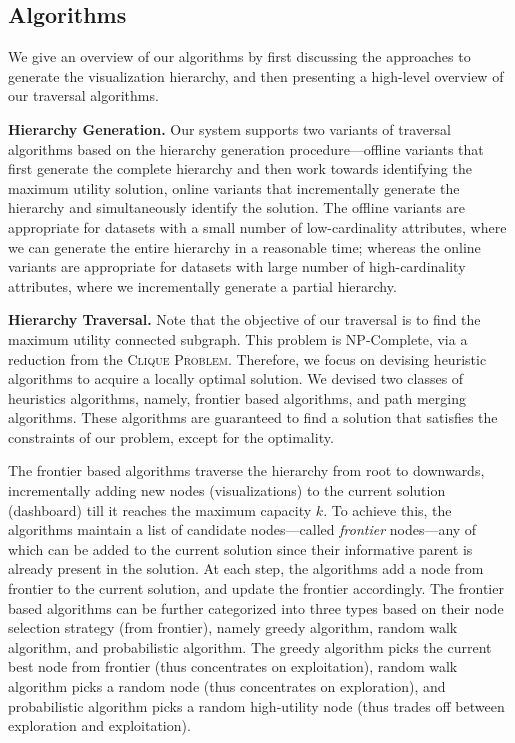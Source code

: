 \subsection{Algorithms}
We give an overview of our algorithms by first discussing the approaches to generate the visualization hierarchy, and then presenting a high-level overview of our traversal algorithms.

\textbf{Hierarchy Generation.} Our system supports two variants of traversal algorithms based on the hierarchy generation procedure---offline variants that first generate the complete hierarchy and then work towards identifying the maximum utility solution, online variants that incrementally generate the hierarchy and simultaneously identify the solution. The offline variants are appropriate for datasets with a small number of low-cardinality attributes, where we can generate the entire hierarchy in a reasonable time; whereas the online variants are appropriate for datasets with large number of high-cardinality attributes, where we incrementally generate a partial hierarchy. 


\textbf{Hierarchy Traversal.} Note that the objective of our traversal is to find the maximum utility connected subgraph. This problem is NP-Complete, via a reduction from the \textsc{Clique Problem}. Therefore, we focus on devising heuristic algorithms to acquire a locally optimal solution. We devised two classes of heuristics algorithms, namely, frontier based algorithms, and path merging algorithms. These algorithms are guaranteed to find a solution that satisfies the constraints of our problem, except for the optimality. 

The frontier based algorithms traverse the hierarchy from root to downwards, incrementally adding new nodes (visualizations) to the current solution (dashboard) till it reaches the maximum capacity $k$. To achieve this, the algorithms maintain a list of candidate nodes---called \textit{frontier} nodes---any of which can be added to the current solution since their informative parent is already present in the solution. At each step, the algorithms add a node from frontier to the current solution, and update the frontier accordingly.  The frontier based algorithms can be further categorized into three types based on their node selection strategy (from frontier), namely greedy algorithm, random walk algorithm, and probabilistic algorithm. The greedy algorithm picks the current best node from frontier (thus concentrates on exploitation), random walk algorithm picks a random node (thus concentrates on exploration), and probabilistic algorithm picks a random high-utility node (thus trades off between exploration and exploitation).

